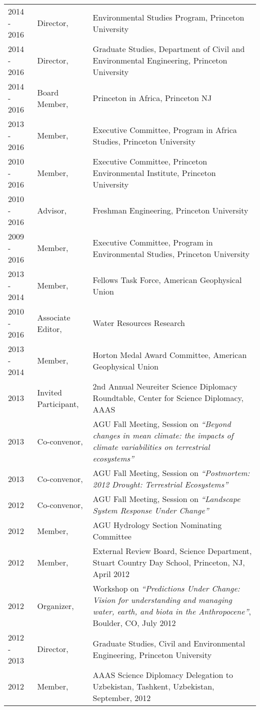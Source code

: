 \documentclass[10pt]{article}
\begin{document}
\begin{longtable}{p{.75in} p{1in} p{4.5in}}
2014 - 2016 & Director, & Environmental Studies Program, Princeton University \\
2014 - 2016 & Director, & Graduate Studies, Department of Civil and Environmental Engineering, Princeton University \\
2014 - 2016 & Board Member, & Princeton in Africa, Princeton NJ \\
2013 - 2016 & Member, & Executive Committee, Program in Africa Studies, Princeton University \\
2010 - 2016 & Member, & Executive Committee, Princeton Environmental Institute, Princeton University \\
2010 - 2016 & Advisor, & Freshman Engineering, Princeton University \\ 
2009 - 2016 & Member, &  Executive Committee, Program in Environmental Studies, Princeton University \\
2013 - 2014 & Member, & Fellows Task Force, American Geophysical Union \\ 
2010 - 2016 & Associate Editor, & Water Resources Research \\ 
2013 - 2014 & Member, & Horton Medal Award Committee, American Geophysical Union \\ 
2013 & Invited Participant, & 2nd Annual Neureiter Science Diplomacy Roundtable, Center for Science Diplomacy, AAAS \\
2013 & Co-convenor, & AGU Fall Meeting, Session on \emph{``Beyond changes in mean climate: the impacts of climate variabilities on terrestrial ecosystems''}\\
2013 & Co-convenor, & AGU Fall Meeting, Session on \emph{``Postmortem: 2012 Drought: Terrestrial Ecosystems''}\\
2012 & Co-convenor, & AGU Fall Meeting, Session on \emph{``Landscape System Response Under Change''} \\
2012 & Member, & AGU Hydrology Section Nominating Committee \\ 
2012 & Member, & External Review Board, Science Department, Stuart Country Day School, Princeton, NJ, April 2012 \\ 
2012 & Organizer, & Workshop on \emph{``Predictions Under Change: Vision for understanding and managing water, earth, and biota in the Anthropocene''}, Boulder, CO, July 2012 \\ 
2012 - 2013 & Director, & Graduate Studies, Civil and Environmental Engineering, Princeton University \\ 
2012 & Member, & AAAS Science Diplomacy Delegation to Uzbekistan, Tashkent, Uzbekistan, September, 2012 \\ 

\end{longtable}
\end{document}
